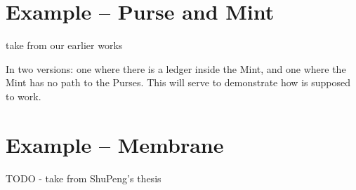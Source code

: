 \documentclass[acmsmall,screen]{acmart}
\begin{document}
\section{Example -- Purse and Mint}
take from our earlier works

In two versions: one where there is a ledger inside the Mint, and one where the Mint has no path to the Purses. This will serve to demonstrate how  is supposed to work.

\section{Example -- Membrane}

TODO - take from ShuPeng's thesis

 \newpage
  
\onecolumn{
 
 }
\end{document}
